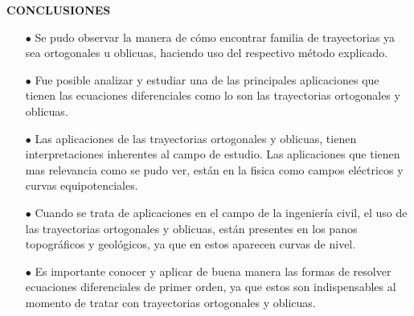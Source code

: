 \documentclass[12pt,letterpaper]{article}
\begin{document}
\begin{titlepage}
\centering
\textbf{CONCLUSIONES}
\vspace{0.3cm}

\begin{itemize}
\item[$\bullet$] Se pudo observar la manera de cómo encontrar familia de trayectorias ya sea ortogonales u oblicuas, haciendo uso del respectivo método explicado.\\

\item[$\bullet$] Fue posible analizar y estudiar una de las principales aplicaciones que tienen las ecuaciones diferenciales como lo son las trayectorias ortogonales y oblicuas.

\item[$\bullet$] Las aplicaciones de las trayectorias ortogonales y oblicuas, tienen interpretaciones inherentes al campo de estudio. Las aplicaciones que tienen mas relevancia como se pudo ver, están en la fisica como campos eléctricos y curvas equipotenciales.

\item[$\bullet$] Cuando se trata de aplicaciones en el campo de la ingeniería civil, el uso de las trayectorias ortogonales y oblicuas, están presentes en los panos topográficos y geológicos, ya que en estos aparecen curvas de nivel.

\item[$\bullet$] Es importante conocer y aplicar de buena manera las formas de resolver ecuaciones diferenciales de primer orden, ya que estos son indispensables al momento de tratar con trayectorias ortogonales y oblicuas.

\end{itemize}
\end{titlepage}
\end{document}
